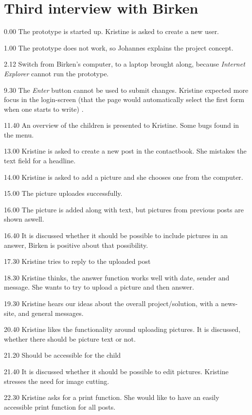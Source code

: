 \section{Third interview with Birken}
\label{third_interview}

0.00
The prototype is started up.
Kristine is asked to create a new user.

1.00
The prototype does not work, so Johannes explains the project concept.

2.12
Switch from Birken's computer, to a laptop brought along, because \emph{Internet Explorer} cannot run the prototype.

9.30
The \emph{Enter} button cannot be used to submit changes. Kristine expected more focus in the login-screen (that the page would automatically select the first form when one starts to write) .

11.40
An overview of the children is presented to Kristine.
Some bugs found in the menu.

13.00
Kristine is asked to create a new post in the contactbook. She mistakes the text field for a headline.

14.00
Kristine is asked to add a picture and she chooses one from the computer.

15.00
The picture uploades successfully.

16.00
The picture is added along with text, but pictures from previous posts are shown aswell.

16.40
It is discussed whether it should be possible to include pictures in an answer, Birken is positive about that possibility.

17.30
Kristine tries to reply to the uploaded post

18.30
Kristine thinks, the answer function works well with date, sender and message. She wants to try to upload a picture and then answer.

19.30
Kristine hears our ideas about the overall project/solution, with a news-site, and general messages.

20.40
Kristine likes the functionality around uploading pictures.
It is discussed, whether there should be picture text or not.

21.20
Should be accessible for the child 

21.40
It is discussed whether it should be possible to edit pictures. Kristine stresses the need for image cutting.

22.30
Kristine asks for a print function. She would like to have an easily accessible print function for all posts.

